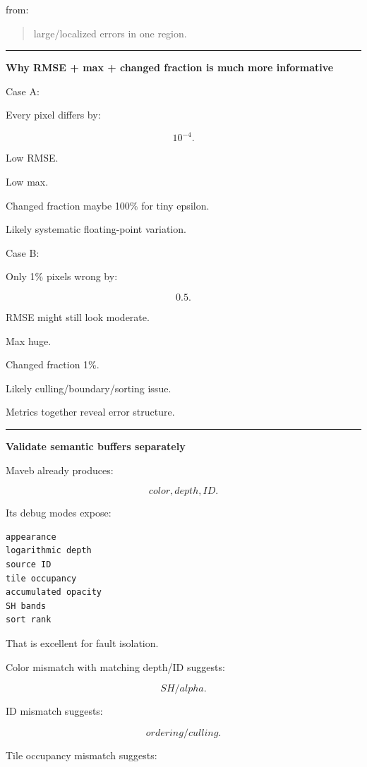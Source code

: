 from:

\begin{quote}
large/localized errors in one region.
\end{quote}

\begin{center}\rule{0.5\linewidth}{0.5pt}\end{center}

\textbf{Why RMSE + max + changed fraction is much more informative}

Case A:

Every pixel differs by:

\[
10^{-4}.
\]

Low RMSE.

Low max.

Changed fraction maybe 100\% for tiny epsilon.

Likely systematic floating-point variation.

Case B:

Only 1\% pixels wrong by:

\[
0.5.
\]

RMSE might still look moderate.

Max huge.

Changed fraction 1\%.

Likely culling/boundary/sorting issue.

Metrics together reveal error structure.

\begin{center}\rule{0.5\linewidth}{0.5pt}\end{center}

\textbf{Validate semantic buffers separately}

Maveb already produces:

\[
color,
depth,
ID.
\]

Its debug modes expose:

\protect{}\label{zp6hzo}%
\begin{verbatim}
appearance
logarithmic depth
source ID
tile occupancy
accumulated opacity
SH bands
sort rank
\end{verbatim}

That is excellent for fault isolation.

Color mismatch with matching depth/ID suggests:

\[
SH/alpha.
\]

ID mismatch suggests:

\[
ordering/culling.
\]

Tile occupancy mismatch suggests:

